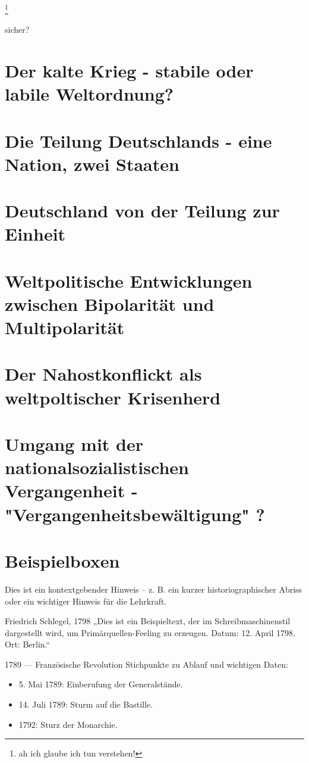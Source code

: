 \documentclass[11pt,a4paper,oneside]{article}
\begin{document}
	\footnote{ah ich glaube ich tun verstehen!}
	
	sicher? 
	
	\newpage
	
	
	\section{Der kalte Krieg - stabile oder labile Weltordnung?}
	\section{Die Teilung Deutschlands - eine Nation, zwei Staaten}
	\section{Deutschland von der Teilung zur Einheit}
	\section{Weltpolitische Entwicklungen zwischen Bipolarität und Multipolarität}
	\section{Der Nahostkonflickt als weltpoltischer Krisenherd}
	\section{Umgang mit der nationalsozialistischen Vergangenheit - "Vergangenheitsbewältigung" ?}
	
	\newpage
	
	\section{Beispielboxen}
	
	\begin{histnote}
		Dies ist ein kontextgebender Hinweis – z. B. ein kurzer historiographischer Abriss oder ein wichtiger Hinweis für die Lehrkraft.
	\end{histnote}

	
	\begin{primarysource}{Friedrich Schlegel, 1798}
		„Dies ist ein Beispieltext, der im Schreibmaschinenstil dargestellt wird, um Primärquellen-Feeling zu erzeugen.
		Datum: 12. April 1798. Ort: Berlin.“
	\end{primarysource}
	
	\begin{timeline}{1789 — Französische Revolution}
		Stichpunkte zu Ablauf und wichtigen Daten:
		\begin{itemize}
			\item 5. Mai 1789: Einberufung der Generalstände.
			\item 14. Juli 1789: Sturm auf die Bastille.
			\item 1792: Sturz der Monarchie.
		\end{itemize}
	\end{timeline}
	
\end{document}

